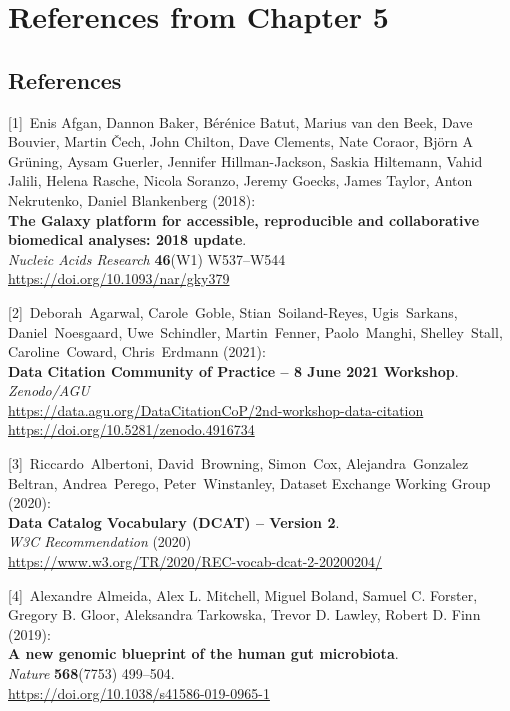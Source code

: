 \section{References from Chapter 5}


\hypertarget{references-2}{%
\subsection{References}\label{references-2}}

{[}1{]}~Enis Afgan, Dannon Baker, Bérénice Batut, Marius van den Beek,
Dave Bouvier, Martin Čech, John Chilton, Dave Clements, Nate Coraor,
Björn A Grüning, Aysam Guerler, Jennifer Hillman-Jackson, Saskia
Hiltemann, Vahid Jalili, Helena Rasche, Nicola Soranzo, Jeremy Goecks,
James Taylor, Anton Nekrutenko, Daniel Blankenberg (2018):\\
\textbf{The Galaxy platform for accessible, reproducible and
collaborative biomedical analyses: 2018 update}.\\
\emph{Nucleic Acids Research} \textbf{46}(W1) W537--W544\\
\url{https://doi.org/10.1093/nar/gky379}

{[}2{]}~Deborah~Agarwal, Carole~Goble, Stian~Soiland-Reyes,
Ugis~Sarkans, Daniel~Noesgaard, Uwe~Schindler, Martin~Fenner,
Paolo~Manghi, Shelley~Stall, Caroline~Coward, Chris~Erdmann (2021):\\
\textbf{Data Citation Community of Practice -- 8 June 2021 Workshop}.\\
\emph{Zenodo/AGU}\\
\url{https://data.agu.org/DataCitationCoP/2nd-workshop-data-citation}~\\
\url{https://doi.org/10.5281/zenodo.4916734}

{[}3{]}~Riccardo~Albertoni, David~Browning, Simon~Cox,
Alejandra~Gonzalez Beltran, Andrea~Perego, Peter~Winstanley, Dataset
Exchange Working Group (2020):\\
\textbf{Data Catalog Vocabulary (DCAT) -- Version 2}.\\
\emph{W3C Recommendation} (2020)\\
\url{https://www.w3.org/TR/2020/REC-vocab-dcat-2-20200204/}

{[}4{]}~Alexandre Almeida, Alex L. Mitchell, Miguel Boland, Samuel C.
Forster, Gregory B. Gloor, Aleksandra Tarkowska, Trevor D. Lawley,
Robert D. Finn (2019):\\
\textbf{A new genomic blueprint of the human gut microbiota}.\\
\emph{Nature} \textbf{568}(7753) 499--504.\\
\url{https://doi.org/10.1038/s41586-019-0965-1}

